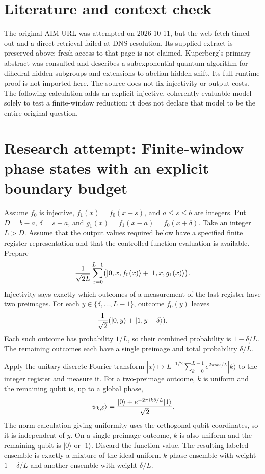 \documentclass[11pt]{article}
\begin{document}
\section{Literature and context check}
The original AIM URL was attempted on 2026-10-11, but the web fetch timed out and a direct retrieval failed at DNS resolution. Its supplied extract is preserved above; fresh access to that page is not claimed. Kuperberg's primary abstract was consulted and describes a subexponential quantum algorithm for dihedral hidden subgroups and extensions to abelian hidden shift. Its full runtime proof is not imported here. The source does not fix injectivity or output costs. The following calculation adds an explicit injective, coherently evaluable model solely to test a finite-window reduction; it does not declare that model to be the entire original question.
\section{Research attempt: Finite-window phase states with an explicit boundary budget}
Assume $f_0$ is injective, $f_1(x)=f_0(x+s)$, and $a\leq s\leq b$ are integers. Put $D=b-a$, $\delta=s-a$, and $g_1(x)=f_1(x-a)=f_0(x+\delta)$. Take an integer $L>D$. Assume that the output values required below have a specified finite register representation and that the controlled function evaluation is available. Prepare
\[
 {1\over\sqrt{2L}}\sum_{x=0}^{L-1}
 \bigl(|0,x,f_0(x)\rangle+|1,x,g_1(x)\rangle\bigr).
\]
Injectivity says exactly which outcomes of a measurement of the last register have two preimages. For each $y\in\{\delta,\ldots,L-1\}$, outcome $f_0(y)$ leaves
\[
 {1\over\sqrt2}(|0,y\rangle+|1,y-\delta\rangle).
\]
Each such outcome has probability $1/L$, so their combined probability is $1-\delta/L$. The remaining outcomes each have a single preimage and total probability $\delta/L$.

Apply the unitary discrete Fourier transform $|x\rangle\mapsto L^{-1/2}\sum_{k=0}^{L-1}e^{2\pi i kx/L}|k\rangle$ to the integer register and measure it. For a two-preimage outcome, $k$ is uniform and the remaining qubit is, up to a global phase,
\[
 |\psi_{k,\delta}\rangle={|0\rangle+e^{-2\pi i k\delta/L}|1\rangle\over\sqrt2}.
\]
The norm calculation giving uniformity uses the orthogonal qubit coordinates, so it is independent of $y$. On a single-preimage outcome, $k$ is also uniform and the remaining qubit is $|0\rangle$ or $|1\rangle$. Discard the function value. The resulting labeled ensemble is exactly a mixture of the ideal uniform-$k$ phase ensemble with weight $1-\delta/L$ and another ensemble with weight $\delta/L$.
\end{document}
